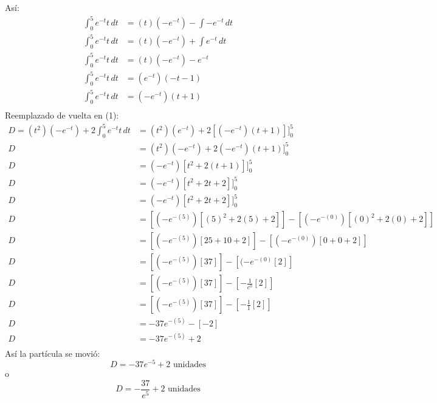 Así:
\begin{align*}
    \int_{0}^{5} e^{-t} t \,  dt &= (t)(-e^{-t}) - \int-e^{-t} \, dt \\
    \int_{0}^{5} e^{-t} t \,  dt &= (t)(-e^{-t}) + \int e^{-t} \, dt \\
    \int_{0}^{5} e^{-t} t \,  dt &= (t)(-e^{-t}) - e^{-t}  \\
    \int_{0}^{5} e^{-t} t \,  dt &= (e^{-t})(-t-1)  \\
    \int_{0}^{5} e^{-t} t \,  dt &= (-e^{-t})(t+1)  \\
\end{align*}
Reemplazado de vuelta en (1):
\begin{align*}
    D = (t^{2})(-e^{-t}) +2 \int_{0}^{5} e^{-t} t \,  dt &= (t^{2})(e^{-t}) +2 [(-e^{-t})(t+1)] \Bigg]_{0}^{5}\\
    D &= (t^{2})(-e^{-t}) +2 (-e^{-t})(t+1) \Bigg]_{0}^{5} \\
    D &= (-e^{-t})[t^{2} + 2(t+1)]\Bigg]_{0}^{5} \\
    D &= (-e^{-t})[t^{2} + 2t +2]\Bigg]_{0}^{5} \\
    D &= (-e^{-t})[t^{2} + 2t +2]\Bigg]_{0}^{5} \\
    D &= [(-e^{-(5)})[(5)^{2} + 2(5) +2]] - [(-e^{-(0)})[(0)^{2} + 2(0) +2]]\\
    D &= [(-e^{-(5)})[25 + 10 +2]] - [(-e^{-(0)})[0 + 0 +2]]\\
    D &= [(-e^{-(5)})[37]] - [(-e^{-(0)}[2]]\\
    D &= [(-e^{-(5)})[37]] - [-\frac{1}{e^{0}}[2]]\\
    D &= [(-e^{-(5)})[37]] - [-\frac{1}{1}[2]]\\
    D &= -37e^{-(5)} - [-2]\\
    D &= -37e^{-(5)} +2\\
\end{align*}
Así la partícula se movió:\\
\[
D = -37e^{-5} +2 \text{ unidades} 
\]
o
\[
D = - \frac{37}{e^{5}} +2 \text{ unidades} 
\]
